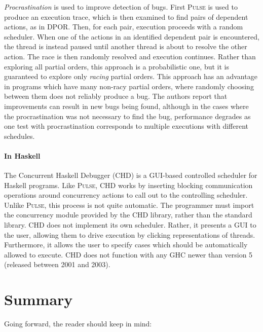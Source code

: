 \emph{Procrastination}\cite{sen2008} is used to improve detection of
bugs.  First \textsc{Pulse} is used to produce an execution trace,
which is then examined to find pairs of dependent actions, as in DPOR.
Then, for each pair, execution proceeds with a random scheduler.  When
one of the actions in an identified dependent pair is encountered, the
thread is instead paused until another thread is about to resolve the
other action.  The race is then randomly resolved and execution
continues.  Rather than exploring all partial orders, this approach is
a probabilistic one, but it is guaranteed to explore only
\emph{racing} partial orders.  This approach has an advantage in
programs which have many non-racy partial orders, where randomly
choosing between them does not reliably produce a bug.  The authors
report that improvements can result in new bugs being found, although
in the cases where the procrastination was not necessary to find the
bug, performance degrades\cite{arts2011} as one test with
procrastination corresponds to multiple executions with different
schedules.

\paragraph{In Haskell}
The Concurrent Haskell Debugger (CHD)\cite{bottcher2002} is a
GUI-based controlled scheduler for Haskell programs.  Like
\textsc{Pulse}, CHD works by inserting blocking communication
operations around concurrency actions to call out to the controlling
scheduler.  Unlike \textsc{Pulse}, this process is not quite
automatic.  The programmer must import the concurrency module provided
by the CHD library, rather than the standard library.  CHD does not
implement its own scheduler.  Rather, it presents a GUI to the user,
allowing them to drive execution by clicking representations of
threads.  Furthermore, it allows the user to specify cases which
should be automatically allowed to execute.  CHD does not function
with any GHC newer than version 5 (released between 2001 and 2003).

\vfill\pagebreak
\section{Summary}

Going forward, the reader should keep in mind:

